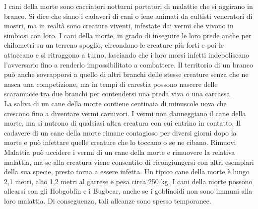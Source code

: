 \begin{multicols}{2}
I cani della morte sono cacciatori notturni portatori di malattie che si aggirano in branco. Si dice che siano i cadaveri di cani o iene animati da cultisti veneratori di mostri, ma in realtà sono creature viventi, infestate dai vermi che vivono in simbiosi con loro. I cani della morte, in grado di inseguire le loro prede anche per chilometri su un terreno spoglio, circondano le creature più forti e poi le attaccano e si ritraggono a turno, lasciando che i loro morsi infetti indeboliscano l'avversario fino a renderlo impossibilitato a combattere. Il territorio di un branco può anche sovrapporsi a quello di altri branchi delle stesse creature senza che ne nasca una competizione, ma in tempi di carestia possono nascere delle scaramucce tra due branchi per contendersi una preda viva o una carcassa.\\

La saliva di un cane della morte contiene centinaia di minuscole uova che crescono fino a diventare vermi carnivori. I vermi non danneggiano il cane della morte, ma si nutrono di qualsiasi altra creatura con cui entrino in contatto. Il cadavere di un cane della morte rimane contagioso per diversi giorni dopo la morte e può infettare quelle creature che lo toccano o se ne cibano. Rimuovi Malattia può uccidere i vermi di un cane della morte e rimuovere la relativa malattia, ma se alla creatura viene consentito di ricongiungersi con altri esemplari della sua specie, presto torna a essere infetta. Un tipico cane della morte è lungo 2,1 metri, alto 1,2 metri al garrese e pesa circa 250 kg. I cani della morte possono allearsi con gli Hobgoblin e i Bugbear, anche se i goblinoidi non sono immuni alla loro malattia. Di conseguenza, tali alleanze sono spesso temporanee. \\


\end{multicols}
